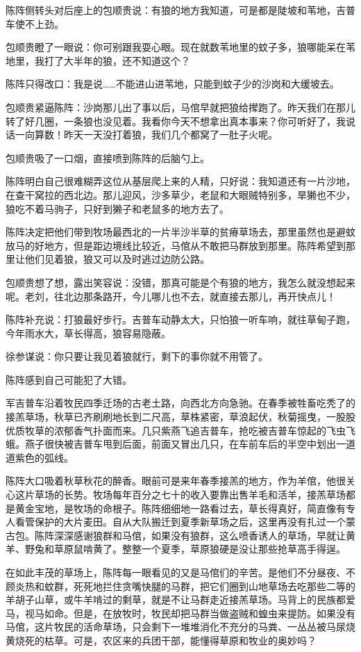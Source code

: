\par 陈阵侧转头对后座上的包顺贵说：有狼的地方我知道，可是都是陡坡和苇地，吉普车使不上劲。
\par 包顺贵瞪了一眼说：你可别跟我耍心眼。现在就数苇地里的蚊子多，狼哪能呆在苇地里，我打了大半年的狼，还不知道这个？
\par 陈阵只得改口：我是说……不能进山进苇地，只能到蚊子少的沙岗和大缓坡去。
\par 包顺贵紧逼陈阵：沙岗那儿出了事以后，马倌早就把狼给撵跑了。昨天我们在那儿转了好几圈，一条狼也没见着。我看你今天不想拿出真本事来？你可听好了，我说话一向算数！昨天一天没打着狼，我们几个都窝了一肚子火呢。
\par 包顺贵吸了一口烟，直接喷到陈阵的后脑勺上。
\par 陈阵明白自己很难糊弄这位从基层爬上来的人精，只好说：我知道还有一片沙地，在查干窝拉的西北边。那儿迎风，沙多草少，老鼠和大眼贼特别多，旱獭也不少，狼吃不着马驹子，只好到獭子和老鼠多的地方去了。
\par 陈阵决定把他们带到牧场最西北的一片半沙半草的贫瘠草场去，那里虽然也是避蚊放马的好地方，但是距边境线比较近，马倌从不敢把马群放到那里。陈阵希望到那里让他们见着狼，狼又可以及时逃过边防公路。
\par 包顺贵想了想，露出笑容说：没错，那真可能是个有狼的地方，我怎么就没想起来呢。老刘，往北边那条路开，今儿哪儿也不去，就直接去那儿，再开快点儿！
\par 陈阵补充说：打狼最好步行。吉普车动静太大，只怕狼一听车响，就往草甸子跑，今年雨水大，草长得高，狼容易隐蔽。
\par 徐参谋说：你只要让我见着狼就行，剩下的事你就不用管了。
\par 陈阵感到自己可能犯了大错。
\par 军吉普车沿着牧民四季迁场的古老土路，向西北方向急驰。在春季被牲畜吃秃了的接羔草场，秋草已齐刷刷地长到二尺高，草株紧密，草浪起伏，秋菊摇曳，一股股优质牧草的浓郁香气扑面而来。几只紫燕飞追吉普车，抢吃被吉普车惊起的飞虫飞蛾。燕子很快被吉普车甩到后面，前面又冒出几只，在车前车后的半空中划出一道道紫色的弧线。
\par 陈阵大口吸着秋草秋花的醉香。眼前可是来年春季接羔的地方，作为羊倌，他很关心这片草场的长势。牧场每年百分之七十的收入要靠出售羊毛和活羊，接羔草场都是黄金宝地，是牧场的命根子。陈阵细细地一路看过去，草长得真好，简直像有专人看管保护的大片麦田。自从大队搬迁到夏季新草场之后，这里再没有扎过一个蒙古包。陈阵深深感谢狼群和马倌，如果没有狼群，这么喷香诱人的草场，早就让黄羊、野兔和草原鼠啃黄了。整整一个夏季，草原狼硬是没让那些抢草高手得逞。
\par 在如此丰茂的草场上，陈阵每一眼看见的又是马倌们的辛苦。是他们不分昼夜、不顾炎热和蚊群，死死地拦住贪嘴快腿的马群，把它们圈到山地草场去吃那些二等的羊胡子山草，或牛羊啃过的剩草，就是不让马群走近接羔草场。马背上的民族都爱马，视马如命。但是，在放牧时，牧民却把马群当做盗贼和蝗虫来提防。如果没有马倌，这片牧民的活命草场，只会剩下一堆堆消化不充分的马粪、一丛丛被马尿烧黄烧死的枯草。可是，农区来的兵团干部，能懂得草原和牧业的奥妙吗？
